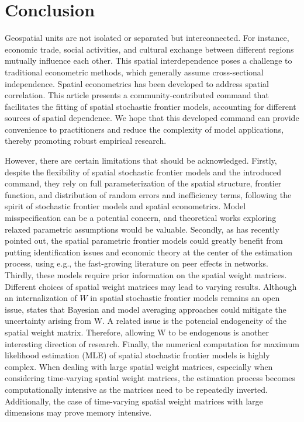  
 


\section{Conclusion}\label{sec_conclusion}
\vspace{5pt}
Geospatial units are not isolated or separated but interconnected. For instance, economic trade, social activities, and cultural exchange between different regions mutually influence each other. This spatial interdependence poses a challenge to traditional econometric methods, which generally assume cross-sectional independence. Spatial econometrics has been developed to address spatial correlation. This article presents a community-contributed command that facilitates the fitting of spatial stochastic frontier models, accounting for different sources of spatial dependence. We hope that this developed command can provide convenience to practitioners and reduce the complexity of model applications, thereby promoting robust empirical research.

However, there are certain limitations that should be acknowledged. Firstly, despite the flexibility of spatial stochastic frontier models and the introduced command, they rely on full parameterization of the spatial structure, frontier function, and distribution of random errors and inefficiency terms, following the spirit of stochastic frontier models and spatial econometrics. Model misspecification can be a potential concern, and theoretical works exploring relaxed parametric assumptions would be valuable. Secondly, as \cite{ayouba2023spatial} has recently pointed out, the spatial parametric frontier models could greatly benefit from putting identification issues and economic theory at the center of the estimation process, using e.g., the fast-growing literature on peer effects in networks. Thirdly, these models require prior information on the spatial weight matrices. Different choices of spatial weight matrices may lead to varying results. Although an  internalization of $W$ in spatial stochastic frontier models remains an open issue, \cite{ayouba2023spatial} states that Bayesian and model averaging approaches could mitigate the uncertainty arising from W. A related issue is the potencial endogeneity of the spatial weight matrix. Therefore, allowing W to be endogenous is another interesting direction of research. Finally, the numerical computation for maximum likelihood estimation (MLE) of spatial stochastic frontier models is highly complex. When dealing with large spatial weight matrices, especially when considering time-varying spatial weight matrices, the estimation process becomes computationally intensive as the matrices need to be repeatedly inverted. Additionally, the case of time-varying spatial weight matrices with large dimensions may prove memory intensive.


